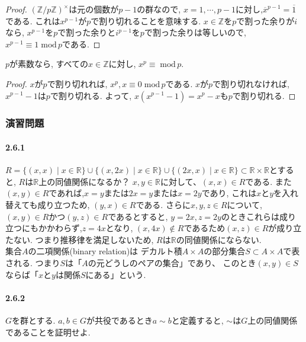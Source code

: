 \begin{proof}
	$(\mathbb{Z}/p\mathbb{Z})^\times $は元の個数が$p-1$の群なので,
	$x=1,\cdots, p-1$に対し,$\overline{x}^{p-1}=\overline{1}$である.
	これは$x^{p-1}$が$p$で割り切れることを意味する.
	$x \in \mathbb{Z}$を$p$で割った余りが$i$なら,
	$x^{p-1}$を$p$で割った余りと$i^{p-1}$を$p$で割った余りは等しいので,
	$x^{p-1} \equiv 1 \; \mathrm{mod}\, p$である.
\end{proof}

\begin{tcolorbox}
	$p$が素数なら, すべての$x \in \mathbb{Z}$に対し,
	$x^p \equiv \; \mathrm{mod} \, p$.
\end{tcolorbox}
\begin{proof}
	$x$が$p$で割り切れれば, $x^p,x \equiv 0 \; \mathrm{mod} \, p$である.
	$x$が$p$で割り切れなければ, $x^{p-1}-1$は$p$で割り切れる.
	よって, $x(x^{p-1}-1)=x^p -x$も$p$で割り切れる.
\end{proof}\leavevmode

\subsubsection*{演習問題}

\paragraph{2.6.1}
 $R=\{ (x,x) \mid x \in \mathbb{R} \} 
 \cup \{ (x,2x) \mid x \in \mathbb{R} \} 
 \cup \{ (2x,x) \mid x \in \mathbb{R} \} 
 \subset \mathbb{R} \times \mathbb{R} $とすると,
 $R$は$\mathbb{R}$上の同値関係になるか？\newline
$x,y \in \mathbb{R}$に対して、$(x,x) \in R$である.
また$(x,y) \in R$であれば,$x=y$または$2x=y$または$x=2y$であり,
これは$x$と$y$を入れ替えても成り立つため, $(y,x)\in R$である.
さらに$x,y,z \in R$について, $(x,y) \in R$かつ$(y,z) \in R$であるとすると,
$y=2x, z=2y$のときこれらは成り立つにもかかわらず,$z=4x$となり,
$(x, 4x)\notin R$であるため$(x,z)\in R$が成り立たない.
つまり推移律を満足しないため, $R$は$\mathbb{R}$の同値関係にならない.\\

集合$A$の二項関係(binary relation)は
デカルト積$A\times A$の部分集合$S\subset A\times A$で表される.
つまり$S$は「$A$の元どうしのペアの集合」であり、
このとき$(x,y) \in S$ならば「$x$と$y$は関係$S$にある」という.\newline

\paragraph{2.6.2}
 $G$を群とする. $a,b \in G$が共役であるとき$a \sim b$と定義すると,
$\sim$は$G$上の同値関係であることを証明せよ.

